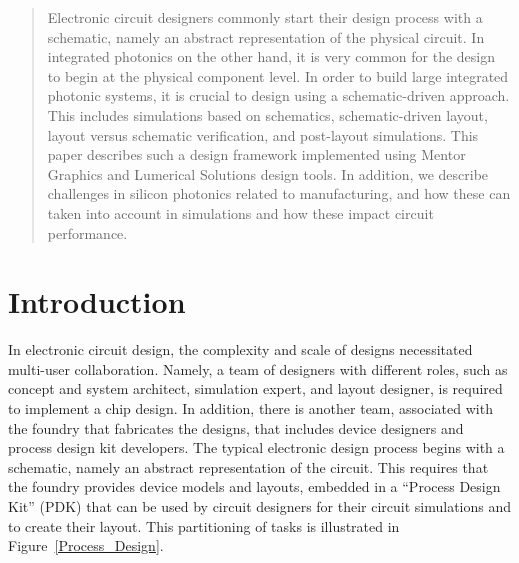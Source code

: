\documentclass[journal]{spie}
\begin{document}
\begin{abstract}

Electronic circuit designers commonly start their design process with a schematic, namely an abstract representation of the physical circuit.  In integrated photonics on the other hand, it is very common for the design to begin at the physical component level.  In order to build large integrated photonic systems, it is crucial to design using a schematic-driven approach.  This includes simulations based on schematics, schematic-driven layout, layout versus schematic verification, and post-layout simulations.   This paper  describes such a design framework implemented using Mentor Graphics and Lumerical Solutions design tools.  In addition, we describe challenges in silicon photonics related to manufacturing, and how these can taken into account in simulations and how these impact circuit performance.



\end{abstract}



\section{Introduction}\label{sec1}

In electronic circuit design, the complexity and scale of designs necessitated multi-user collaboration.  Namely, a team of designers with different roles, such as concept and system architect, simulation expert, and layout designer, is required to implement a chip design.  In addition, there is another team, associated with the foundry that fabricates the designs, that includes device designers and process design kit developers.  The typical electronic design process begins with a schematic, namely an abstract representation of the circuit.  This requires that the foundry provides device models and layouts, embedded in a ``Process Design Kit'' (PDK) that can be used by circuit designers for their circuit simulations and to create their layout.  This partitioning of tasks is illustrated in Figure~\ref{Process_Design}.
\end{document}
